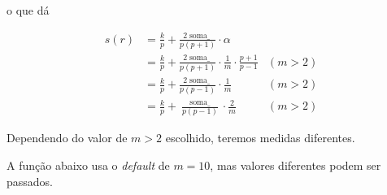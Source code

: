 \documentclass[
  letterpaper,
  DIV=11,
  numbers=noendperiod]{scrreprt}
\newenvironment{Shaded}{\begin{snugshade}}{\end{snugshade}}
\newcommand{\AttributeTok}[1]{\textcolor[rgb]{0.40,0.45,0.13}{#1}}
\newcommand{\ControlFlowTok}[1]{\textcolor[rgb]{0.00,0.23,0.31}{#1}}
\newcommand{\DecValTok}[1]{\textcolor[rgb]{0.68,0.00,0.00}{#1}}
\newcommand{\FunctionTok}[1]{\textcolor[rgb]{0.28,0.35,0.67}{#1}}
\newcommand{\NormalTok}[1]{\textcolor[rgb]{0.00,0.23,0.31}{#1}}
\newcommand{\OtherTok}[1]{\textcolor[rgb]{0.00,0.23,0.31}{#1}}
\newcommand{\SpecialCharTok}[1]{\textcolor[rgb]{0.37,0.37,0.37}{#1}}
\begin{document}
\begin{itemize}
  o que dá

  \[
  \begin{aligned}
  s(r) 
  &= \frac{k}{p} + \frac{2\operatorname{soma\_}}{p(p+1)} \cdot \alpha \\
  &= \frac{k}{p} + \frac{2\operatorname{soma\_}}{p(p+1)} \cdot 
    \frac1m \cdot \frac{p + 1}{p - 1} & (m > 2) \\
  &= \frac{k}{p} + \frac{2\operatorname{soma\_}}{p(p-1)} \cdot 
    \frac1m & (m > 2) \\
  &= \frac{k}{p} + \frac{\operatorname{soma\_}}{p(p-1)} \cdot 
    \frac2m & (m > 2)
  \end{aligned}
  \]

  Dependendo do valor de $m > 2$ escolhido, teremos medidas diferentes.

  A função abaixo usa o \emph{default} de $m = 10$, mas valores
  diferentes podem ser passados.
\end{itemize}

\begin{Shaded}
\end{Shaded}
\end{document}
